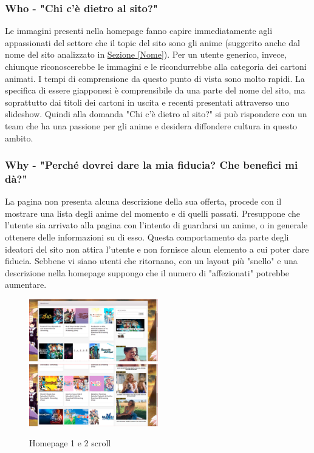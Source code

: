 \subsubsection{Who - "Chi c'è dietro al sito?"} \label{HWho}
Le immagini presenti nella homepage fanno capire immediatamente agli appassionati del settore che il topic del sito sono gli anime (suggerito anche dal nome del sito analizzato in \hyperref[Nome]{Sezione \ref{Nome}}). Per un utente generico, invece, chiunque riconoscerebbe le immagini e le ricondurrebbe alla categoria dei cartoni animati. I tempi di comprensione da questo punto di vista sono molto rapidi. La specifica di essere giapponesi è comprensibile da una parte del nome del sito, ma soprattutto dai titoli dei cartoni in uscita e recenti presentati attraverso uno slideshow. Quindi alla domanda "Chi c'è dietro al sito?" si può rispondere con un team che ha una passione per gli anime e desidera diffondere cultura in questo ambito.

\subsubsection{Why - "Perché dovrei dare la mia fiducia? Che benefici mi dà?"} \label{HWhy}
La pagina non presenta alcuna descrizione della sua offerta, procede con il mostrare una lista degli anime del momento e di quelli passati. Presuppone che l'utente sia arrivato alla pagina con l'intento di guardarsi un anime, o in generale ottenere delle informazioni su di esso. Questa comportamento da parte degli ideatori del sito non attira l'utente e non fornisce alcun elemento a cui poter dare fiducia. Sebbene vi siano utenti che ritornano, con un layout più "snello" e una descrizione nella homepage suppongo che il numero di "affezionati" potrebbe aumentare.

\begin{figure}[H]
	\includegraphics[width=0.5\textwidth]{img/homepage02.png}
	\includegraphics[width=0.5\textwidth]{img/homepage03.png}
	\caption{Homepage 1 e 2 scroll} 
	\label{img2} 
\end{figure}

